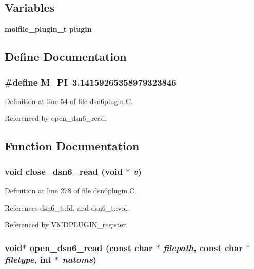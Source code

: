 \subsection*{Variables}
\begin{CompactItemize}
\item 
{\bf molfile\_\-plugin\_\-t} {\bf plugin}
\end{CompactItemize}


\subsection{Define Documentation}
\subsubsection{\setlength{\rightskip}{0pt plus 5cm}\#define M\_\-PI\ 3.14159265358979323846}\label{dsn6plugin_8C_a0}




Definition at line 54 of file dsn6plugin.C.

Referenced by open\_\-dsn6\_\-read.

\subsection{Function Documentation}
\subsubsection{\setlength{\rightskip}{0pt plus 5cm}void close\_\-dsn6\_\-read (void $\ast$ {\em v})\hspace{0.3cm}{\tt  [static]}}\label{dsn6plugin_8C_a5}




Definition at line 278 of file dsn6plugin.C.

References dsn6\_\-t::fd, and dsn6\_\-t::vol.

Referenced by VMDPLUGIN\_\-register.
\subsubsection{\setlength{\rightskip}{0pt plus 5cm}void$\ast$ open\_\-dsn6\_\-read (const char $\ast$ {\em filepath}, const char $\ast$ {\em filetype}, int $\ast$ {\em natoms})\hspace{0.3cm}{\tt  [static]}}\label{dsn6plugin_8C_a2}




